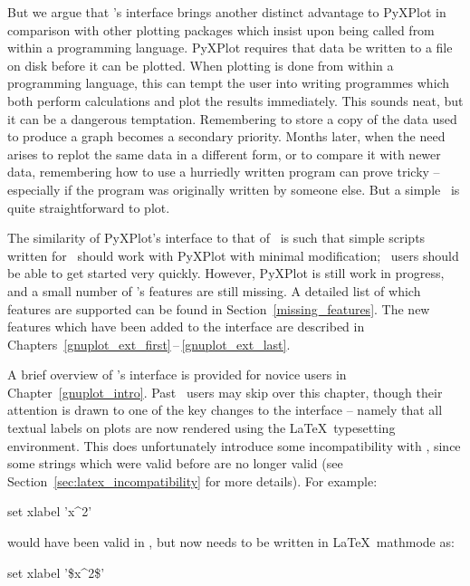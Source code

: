 But we argue that \gnuplot's interface brings another distinct advantage to
PyXPlot in comparison with other plotting packages which insist upon being
called from within a programming language. PyXPlot requires that data be
written to a file on disk before it can be plotted. When plotting is done from
within a programming language, this can tempt the user into writing programmes
which both perform calculations and plot the results immediately.  This sounds
neat, but it can be a dangerous temptation. Remembering to store a copy of the
data used to produce a graph becomes a secondary priority.  Months later, when
the need arises to replot the same data in a different form, or to compare it
with newer data, remembering how to use a hurriedly written program can prove
tricky -- especially if the program was originally written by someone else. But
a simple \datafile\ is quite straightforward to plot.

The similarity of PyXPlot's interface to that of \gnuplot\ is such that simple
scripts written for \gnuplot\ should work with PyXPlot with minimal
modification; \gnuplot\ users should be able to get started very quickly.
However, PyXPlot is still work in progress, and a small number of \gnuplot's
features are still missing.  A detailed list of which features are supported
can be found in Section~\ref{missing_features}. The new features which have
been added to the interface are described in
Chapters~\ref{gnuplot_ext_first}\,--\,\ref{gnuplot_ext_last}.

A brief overview of \gnuplot's interface is provided for novice users in
Chapter~\ref{gnuplot_intro}. Past \gnuplot\ users may skip over this chapter,
though their attention is drawn to one of the key changes to the interface --
namely that all textual labels on plots are now rendered using the \LaTeX\
typesetting environment. This does unfortunately introduce some incompatibility
with \gnuplot, since some strings which were valid before are no longer valid
(see Section~\ref{sec:latex_incompatibility} for more details). For
example:\index{latex}

\begin{dontdo}
set xlabel 'x\^{}2'
\end{dontdo}

\noindent would have been valid in \gnuplot, but now needs to be written in
\LaTeX\ mathmode as:

\begin{dodo}
set xlabel '\$x\^{}2\$'
\end{dodo}

